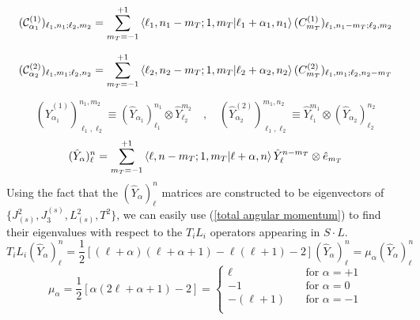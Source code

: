 \newpage
%
%
\begin{equation}\label{modified fuzzy sphere fields 1}
(\mathcal{C}^{(1)}_{\alpha_1})_{\ell_1,n_1; \ell_2, m_2}
=
\sum_{m_T = -1}^{+1}
\braket{\ell_1,n_1-m_T;1,m_T}{\ell_1 + \alpha_1, n_1}
(C^{(1)}_{m_T})_{\ell_1,n_1-m_T;\ell_2,m_2}
\end{equation}
%
%

%
%
\begin{equation}\label{modified fuzzy sphere fields 2}
(\mathcal{C}^{(2)}_{\alpha_2})_{\ell_1, m_1; \ell_2,n_2}
=
\sum_{m_T = -1}^{+1}
\braket{\ell_2,n_2-m_T;1,m_T}{\ell_2 + \alpha_2, n_2}
(C^{(2)}_{m_T})_{\ell_1,m_1;\ell_2,n_2-m_T}
\end{equation}
%
%

%
%
\begin{equation}
(\hat{Y}^{(1)}_{\alpha_1})^{n_1,m_2}_{\ell_1,\ell_2}
\equiv
(\hat{Y}_{\alpha_1})^{n_1}_{\ell_1} \otimes \hat{Y}^{m_2}_{\ell_2}
%
\quad , \quad
%
(\hat{Y}^{(2)}_{\alpha_2})^{m_1,n_2}_{\ell_1,\ell_2}
\equiv
\hat{Y}^{m_1}_{\ell_1} \otimes (\hat{Y}_{\alpha_2})^{n_2}_{\ell_2}
\end{equation}
%
%
\begin{equation}\label{modified fuzzy spherical harmonics rewritten}
(\hat{Y}_\alpha)^n_\ell
=
\sum_{m_T=-1}^{+1}
\braket{\ell, n-m_T ;1,m_T}{\ell+\alpha,n}
\hat{Y}_\ell^{n-m_T} \otimes \hat{e}_{m_T}
\end{equation}
%
%
Using the fact that the $(\hat{Y}_\alpha)^n_{\ell}$ matrices are constructed to be eigenvectors of $\{ J^2_{(s)}, J_3^{(s)} , L^2_{(s)} , T^2 \}$, we can easily use (\ref{total angular momentum}) to find their eigenvalues with respect to the $T_i L_i$ operators appearing in $S \cdot L$.
%
%
\begin{equation}
T_i L_i (\hat{Y}_\alpha)^n_{\ell}
=
\frac{1}{2} \left[
(\ell + \alpha) (\ell + \alpha + 1)
- \ell (\ell + 1)
- 2
\right]
(\hat{Y}_\alpha)^n_{\ell}
=
\mu_{\alpha}
(\hat{Y}_\alpha)^n_{\ell}
\end{equation}
%
%
\begin{equation}\label{modified fuzzy eigenvalues}
\mu_\alpha = \frac{1}{2} \left[
\alpha (2 \ell + \alpha + 1)
- 2
\right]
=
\begin{cases}
	\ell
	& \quad \text{for } \alpha = +1 \\
		
    -1
	& \quad \text{for } \alpha = 0 \\
	
	-(\ell + 1)
	& \quad \text{for } \alpha = -1 \\
\end{cases}
\end{equation}

